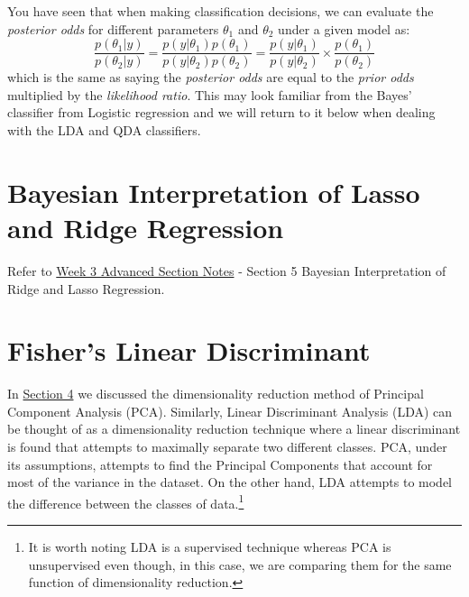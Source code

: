 \documentclass{article}
\begin{document}
You have seen that when making classification decisions, we can evaluate the \textit{posterior odds} for different parameters $\theta_1$ and $\theta_2$ under a given model as:
$$
\frac{p(\theta_1 \vert y)}{p(\theta_2 \vert y)} = \frac{p(y \vert \theta_1)p(\theta_1)}{p(y \vert \theta_2)p(\theta_2)} = \frac{p(y \vert \theta_1)}{p(y \vert \theta_2)} \times \frac{p(\theta_1)}{p(\theta_2)}
$$
which is the same as saying the \textit{posterior odds} are equal to the \textit{prior odds} multiplied by the \textit{likelihood ratio}. This may look familiar from the Bayes' classifier from Logistic regression and we will return to it below when dealing with the LDA and QDA classifiers.

\section{Bayesian Interpretation of Lasso and Ridge Regression}
Refer to \href{https://github.com/cs109/a-2017/blob/master/Sections/advanced/sec3.pdf}{Week 3 Advanced Section Notes} - Section 5 Bayesian Interpretation of Ridge and Lasso Regression.

\section{Fisher's Linear Discriminant}
In \href{https://github.com/cs109/a-2017/blob/master/Sections/advanced/sec4.pdf}{Section 4} we discussed the dimensionality reduction method of Principal Component Analysis (PCA). Similarly, Linear Discriminant Analysis (LDA) can be thought of as a dimensionality reduction technique where a linear discriminant is found that attempts to maximally separate two different classes. PCA, under its assumptions, attempts to find the Principal Components that account for most of the variance in the dataset. On the other hand, LDA attempts to model the difference between the classes of data.\footnote{It is worth noting LDA is a supervised technique whereas PCA is unsupervised even though, in this case, we are comparing them for the same function of dimensionality reduction.}
\end{document}
